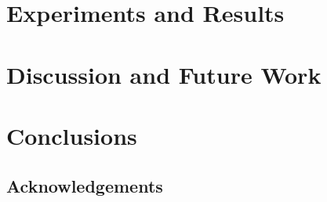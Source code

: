 \documentclass[letterpaper, 10 pt, conference]{ieeeconf}
\begin{document}

\section{Experiments and Results}
\label{sec:expt}

\section{Discussion and Future Work}
\label{sec:discussion}

\section{Conclusions}
\label{sec:conclusion}

\subsection*{Acknowledgements}
\label{sec:ack}



\end{document}
